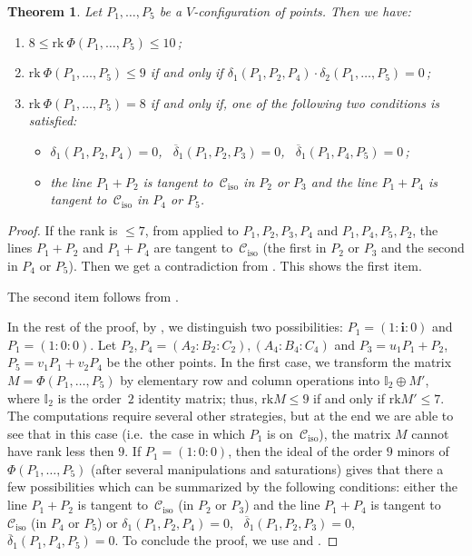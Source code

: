 \documentclass{amsart}
\theoremstyle{plain}
\newtheorem{theorem}[lemma]{Theorem}
\theoremstyle{definition}
\newcommand{\iso}{\mathcal{C}_{\mathrm{iso}}}
\newcommand{\iii}{\textbf{i}}
\newcommand{\rk}{\ensuremath{\mathrm{rk}}}
\begin{document}
\begin{theorem}
\label{theorem:rank_V}
Let $P_1, \dots, P_5$ be a $V$-configuration of
points. Then we have:
\begin{enumerate}
\item $8 \leq \rk \ \Phi(P_1, \dots, P_5) \leq 10$\,;
\item $\rk \ \Phi(P_1, \dots, P_5) \leq 9$ if and only if
$\delta_1(P_1, P_2, P_4) \cdot \delta_2(P_1, \dots, P_5) =0$\,;
\item $\rk \ \Phi(P_1, \dots, P_5) = 8$ if and only if, one of
the following two conditions is satisfied:
%
\begin{itemize}
\item $\delta_1(P_1, P_2, P_4) = 0$, \
$\overline{\delta}_1(P_1, P_2, P_3) = 0$,
\ $\overline{\delta}_1(P_1, P_4, P_5) = 0$\,;
  \item the line $P_1+P_2$ is tangent to~$\iso$ in $P_2$ or $P_3$
and the line $P_1+P_4$ is tangent to~$\iso$ in $P_4$ or $P_5$.
\end{itemize}
%
\end{enumerate}
\end{theorem}
\begin{proof}
If the rank is $\leq 7$, from
 applied to $P_1, P_2, P_3, P_4$ and $P_1, P_4, P_5, P_2$,
the lines $P_1+P_2$ and $P_1 + P_4$ are tangent to~$\iso$ (the first in $P_2$ or $P_3$ and the second in $P_4$ or $P_5$).
Then we get a contradiction from \Cref{lemma:special_case_rank_8}.
This shows the first item.

The second item follows from .

In the rest of the proof, by , we distinguish two possibilities:
$P_1 = (1:\iii :0)$ and
$P_1 = (1: 0: 0)$.
Let $P_2, P_4 = (A_2: B_2: C_2), (A_4: B_4: C_4)$ and
$P_3 = u_1P_1+P_2$, $P_5 = v_1P_1+v_2P_4$ be the other points.
In the first case, we transform the matrix $M = \Phi(P_1, \dots, P_5)$ by elementary row and column operations into $\mathbb{I}_2 \oplus M'$, where $\mathbb{I}_2$ is the order~$2$ identity matrix; thus, $\rk  M \leq 9$ if and only if $\rk  M' \leq 7$.
The computations require several other strategies, but at the end we are
able to see that in this case (i.e.\ the case in which $P_1$ is on~$\iso$), the matrix $M$ cannot have rank less then $9$.
If $P_1 = (1: 0: 0)$, then the ideal of the order $9$ minors of
$\Phi(P_1, \dots, P_5)$ (after several manipulations and saturations)
gives that there a few possibilities which can be summarized by the
following conditions: either the line $P_1+P_2$ is tangent to~$\iso$ (in $P_2$ or $P_3$) and the line $P_1+P_4$ is tangent to~$\iso$ (in $P_4$ or $P_5$) or $\delta_1(P_1, P_2, P_4) = 0$,
\ $\overline{\delta}_1(P_1, P_2, P_3) = 0$,
\ $\overline{\delta}_1(P_1, P_4, P_5) = 0$.
To conclude the proof, we use  and .
\end{proof}
\end{document}
